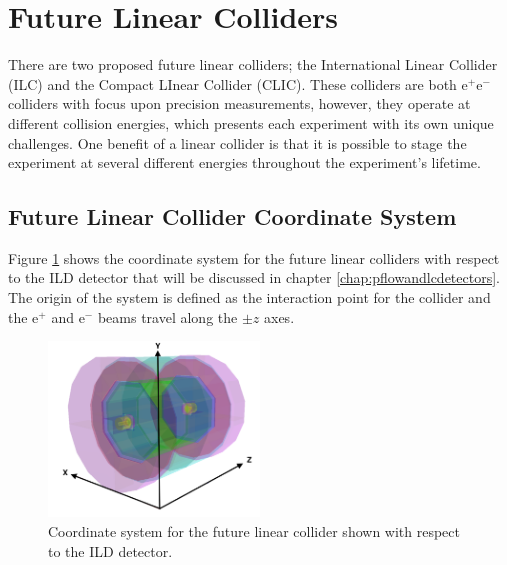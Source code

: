 
\section{Future Linear Colliders}
There are two proposed future linear colliders; the International Linear Collider (ILC) and the Compact LInear Collider (CLIC).  These colliders are both $\text{e}^{+}\text{e}^{-}$ colliders with focus upon precision measurements, however, they operate at different collision energies, which presents each experiment with its own unique challenges.  One benefit of a linear collider is that it is possible to stage the experiment at several different energies throughout the {experiment's lifetime.}


\subsection{Future Linear Collider Coordinate System}
\label{sec:axes}
Figure \ref{fig:coordinates} shows the coordinate system for the future linear colliders with respect to the ILD detector that will be discussed in chapter \ref{chap:pflowandlcdetectors}.  The origin of the system is defined as the interaction point for the collider and the $\text{e}^{+}$ and $\text{e}^{-}$ beams travel along the $\pm z$ axes.

\begin{figure}[h!]
\includegraphics[width=0.5\textwidth]{Introduction/Plots/CoordinateSystem.png}
\caption[Coordinate system for the future linear collider shown with respect to the ILD detector.]{Coordinate system for the future linear collider shown with respect to the ILD detector.}
\label{fig:coordinates}
\end{figure}

